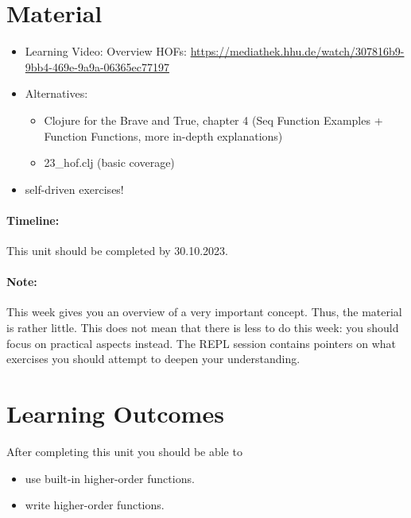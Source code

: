 \documentclass[11pt,a4paper]{article}
\begin{document}

\section{Material} 

\begin{itemize}
    \item Learning Video: Overview HOFs: \url{https://mediathek.hhu.de/watch/307816b9-9bb4-469e-9a9a-06365ec77197}
    \item Alternatives:
        \begin{itemize}
            \item Clojure for the Brave and True, chapter 4 (Seq Function Examples + Function Functions, more in-depth explanations)
            \item 23\_hof.clj (basic coverage)
        \end{itemize}
    \item self-driven exercises!
\end{itemize}

\paragraph{Timeline:} This unit should be completed by 30.10.2023.

\paragraph{Note:} This week gives you an overview of a very important concept.
Thus, the material is rather little.
This does not mean that there is less to do this week: you should focus on practical aspects instead.
The REPL session contains pointers on what exercises you should attempt to deepen your understanding.


\section{Learning Outcomes}

After completing this unit you should be able to

\begin{itemize}
    \item use built-in higher-order functions.
    \item write higher-order functions.
\end{itemize}
\end{document}
